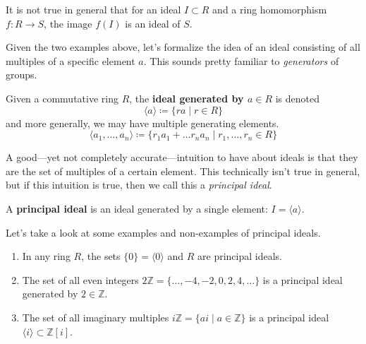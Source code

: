   \begin{example}
    \label{ex:image-of-ideal-is-not-necessarily-an-ideal}
    It is not true in general that for an ideal $I \subset R$ and a ring homomorphism $f: R \to S$, the image $f(I)$ is an ideal of $S$. 
  \end{example}

  Given the two examples above, let's formalize the idea of an ideal consisting of all multiples of a specific element $a$. This sounds pretty familiar to \textit{generators} of groups. 

  \begin{definition}
    \label{def:generators-of-ideals}
    Given a commutative ring $R$, the \textbf{ideal generated by $a \in R$} is denoted 
    \begin{equation}
      \langle a \rangle \coloneqq \{r a \mid r \in R\}
    \end{equation}
    and more generally, we may have multiple generating elements. 
    \begin{equation}
      \langle a_1, \ldots, a_n \rangle \coloneqq \{ r_1 a_1 + \ldots r_n a_n \mid r_1, \ldots, r_n \in R \}
    \end{equation}
  \end{definition}

  A good---yet not completely accurate---intuition to have about ideals is that they are the set of multiples of a certain element. This technically isn't true in general, but if this intuition is true, then we call this a \textit{principal ideal}. 

  \begin{definition}
    \label{def:principal-ideals}
    A \textbf{principal ideal} is an ideal generated by a single element: $I = \langle a \rangle$. 
  \end{definition}

  \begin{example}
    \label{ex:some-principal-ideals}
    Let's take a look at some examples and non-examples of principal ideals. 
    \begin{enumerate}
      \item In any ring $R$, the sets $\{0\} = \langle 0 \rangle$ and $R$ are principal ideals. 
      \item The set of all even integers $2\mathbb{Z} = \{\ldots, -4, -2, 0, 2, 4, \ldots\}$ is a principal ideal generated by $2 \in \mathbb{Z}$. 
      \item The set of all imaginary multiples $i\mathbb{Z} = \{ai \mid a \in \mathbb{Z} \}$ is a principal ideal $\langle i \rangle \subset \mathbb{Z}[i]$. 
    \end{enumerate}
  \end{example}

